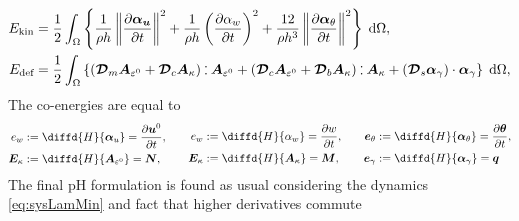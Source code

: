\begin{equation*}
\begin{aligned}
E_{\text{kin}} &= \energy{\frac{1}{\rho h} \norm{\diffp{\bm{\alpha_u}}{t}}^2 + \frac{1}{\rho h} \left(\diffp{\alpha_w}{t}\right)^2 + \frac{12}{\rho h^3} \norm{\diffp{\bm{\alpha}_\theta}{t}}^2}, \\
E_{\text{def}} &= \energy{(\bm{\mathcal{D}}_m \bm{A}_{\varepsilon^0} + \bm{\mathcal{D}}_c \bm{A}_{\kappa}) \cddot \bm{A}_{\varepsilon^0} + (\bm{\mathcal{D}}_c \bm{A}_{\varepsilon^0} + \bm{\mathcal{D}}_b \bm{A}_{\kappa}) \cddot \bm{A}_{\kappa} + (\bm{\mathcal{D}}_s \bm{\alpha}_{\gamma}) \cdot \bm{\alpha}_{\gamma}}, 
\end{aligned}
\end{equation*}
The co-energies are equal to
\begin{equation}
\begin{aligned}
e_w &:= \diffd{H}{\bm\alpha_u} = \diffp{\bm{u}^0}{t},\\
\bm{E}_{\kappa} &:= \diffd{H}{\bm{A}_{\varepsilon^0}} = \bm{N},\\
\end{aligned} \qquad
\begin{aligned}
e_w &:= \diffd{H}{\alpha_w} = \diffp{w}{t}, \\
\bm{E}_{\kappa} &:= \diffd{H}{\bm{A}_{\kappa}} = \bm{M}, \\
\end{aligned} \qquad
\begin{aligned}
\bm{e}_{\theta} &:= \diffd{H}{\bm\alpha_{\theta}} = \diffp{\bm{\theta}}{t}, \\
\bm{e}_{\gamma} &:= \diffd{H}{\bm\alpha_\gamma} = \bm{q}  \\
\end{aligned}
\end{equation}
The final pH formulation is found as usual considering the dynamics \eqref{eq:sysLamMin} and fact that higher derivatives commute
